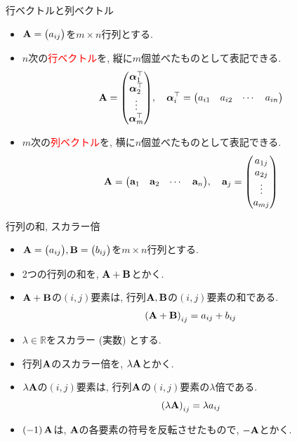 \documentclass[dvipdfmx,notheorems,t]{beamer}
\begin{document}
\begin{frame}{行ベクトルと列ベクトル}
\begin{itemize}
  \item $\vb{A} = \mqty(a_{ij})$を$m \times n$行列とする.
  \item $n$次の\textcolor{red}{行ベクトル}を, 縦に$m$個並べたものとして表記できる.
  \begin{align*}
    \vb{A} = \mqty(\vb*{\alpha}_1^\top \\ \vb*{\alpha}_2^\top \\ \vdots \\ \vb*{\alpha}_m^\top),
      \quad \vb*{\alpha}_i^\top = \mqty(a_{i1} & a_{i2} & \cdots & a_{in})
  \end{align*}
  \item $m$次の\textcolor{red}{列ベクトル}を, 横に$n$個並べたものとして表記できる.
  \begin{align*}
    \vb{A} = \mqty(\vb{a}_1 & \vb{a}_2 & \cdots & \vb{a}_n),
      \quad \vb{a}_j = \mqty(a_{1j} \\ a_{2j} \\ \vdots \\ a_{mj})
  \end{align*}
\end{itemize}
\end{frame}

\begin{frame}{行列の和, スカラー倍}
\begin{itemize}
  \item $\vb{A} = \mqty(a_{ij}), \vb{B} = \mqty(b_{ij})$を$m \times n$行列とする.
  \item 2つの行列の和を, $\vb{A} + \vb{B}$とかく.
  \item $\vb{A} + \vb{B}$の$(i, j)$要素は, 行列$\vb{A}, \vb{B}$の$(i, j)$要素の和である.
  \begin{align*}
    \left( \vb{A} + \vb{B} \right)_{ij} = a_{ij} + b_{ij}
  \end{align*}

  \item $\lambda \in \mathbb{R}$をスカラー (実数) とする.
  \item 行列$\vb{A}$のスカラー倍を, $\lambda \vb{A}$とかく.
  \item $\lambda \vb{A}$の$(i, j)$要素は, 行列$\vb{A}$の$(i, j)$要素の$\lambda$倍である.
  \begin{align*}
    \left( \lambda \vb{A} \right)_{ij} = \lambda a_{ij}
  \end{align*}
  \item $\left( -1 \right) \vb{A}$は, $\vb{A}$の各要素の符号を反転させたもので, $-\vb{A}$とかく.
\end{itemize}
\end{frame}
\end{document}
